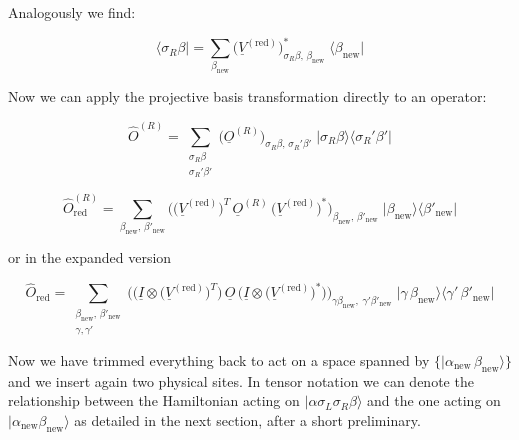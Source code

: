 Analogously we find:

\begin{equation}
\boxed{\;\big\langle\sigma_R\beta\big| = \sum_{\beta_{\mathrm{new}}}\big(\underline{V}^{(\mathrm{red})}\big)^{*}_{\sigma_R\beta,\,\beta_{\mathrm{new}}}\;\big\langle\beta_{\mathrm{new}}\big|\;}
\end{equation}

Now we can apply the projective basis transformation directly to an
operator:

\begin{equation}
\hat O^{(R)} = \sum_{\substack{\sigma_R\beta\\ \sigma_R'\beta'}}
\big(\underline{O}^{(R)}\big)_{\sigma_R\beta,\,\sigma_R'\beta'}\;
\big|\sigma_R\beta\big\rangle\big\langle\sigma_R'\beta'\big|
\end{equation}

\begin{equation}\label{eq:projective-basis-trafo-right}
\boxed{\;\hat O^{(R)}_{\mathrm{red}} = \sum_{\beta_{\mathrm{new}},\,\beta'_{\mathrm{new}}}
\Big(\big(\underline{V}^{(\mathrm{red})}\big)^{T}\,\underline{O}^{(R)}\,\big(\underline{V}^{(\mathrm{red})}\big)^{*}\Big)_{\beta_{\mathrm{new}},\,\beta'_{\mathrm{new}}}\;
\big|\beta_{\mathrm{new}}\big\rangle\big\langle\beta'_{\mathrm{new}}\big|\;}
\end{equation}

or in the expanded version

\begin{equation}
\boxed{\;\hat O_{\mathrm{red}} = \sum_{\substack{\beta_{\mathrm{new}},\,\beta'_{\mathrm{new}}\\ \gamma,\gamma'}}
\Big(\big(\underline{I}\otimes\big(\underline{V}^{(\mathrm{red})}\big)^{T}\big)\,\underline{O}\,\big(\underline{I}\otimes\big(\underline{V}^{(\mathrm{red})}\big)^{*}\big)\Big)_{\gamma\beta_{\mathrm{new}},\;\gamma'\beta'_{\mathrm{new}}}\;
\big|\gamma\,\beta_{\mathrm{new}}\big\rangle\big\langle\gamma'\,\beta'_{\mathrm{new}}\big|\;}
\end{equation}

Now we have trimmed everything back to act on a space spanned by
$\{|\alpha_{\mathrm{new}}\,\beta_{\mathrm{new}}\rangle\}$ and we insert
again two physical sites. In tensor notation we can denote the
relationship between the Hamiltonian acting on
$|\alpha\sigma_L\sigma_R\beta\rangle$ and the one acting on
$|\alpha_{\mathrm{new}}\beta_{\mathrm{new}}\rangle$ as detailed in the
next section, after a short preliminary.

